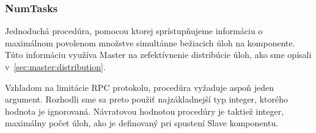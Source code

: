 \subsubsection{NumTasks}

Jednoduchá procedúra, pomocou ktorej sprístupňujeme informáciu o maximálnom
povolenom množstve simultánne bežiacich úloh na komponente. Túto informáciu
využíva Master na zefektívnenie distribúcie úloh, ako sme opísali v~\ref{sec:master:distribution}.

Vzhľadom na limitácie RPC protokolu, procedúra vyžaduje aspoň jeden argument. Rozhodli
sme sa preto použiť najzákladnejší typ integer, ktorého hodnota je ignorovaná. Návratovou
hodnotou procedúry je taktiež integer, maximálny počet úloh, ako je definovaný pri
spustení Slave komponentu.
